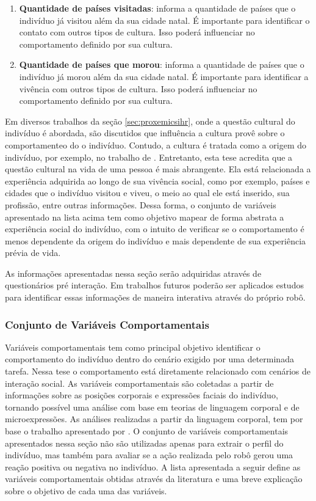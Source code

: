 \begin{enumerate}
	\item \textbf{Quantidade de países visitadas}: informa a quantidade de países que o indivíduo já visitou além da sua cidade natal. É importante para identificar o contato com outros tipos de cultura. Isso poderá influenciar no comportamento definido por sua cultura.
	\item \textbf{Quantidade de países que morou}: informa a quantidade de países que o indivíduo já morou além da sua cidade natal. É importante para identificar a vivência com outros tipos de cultura. Isso poderá influenciar no comportamento definido por sua cultura.
\end{enumerate}

Em diversos trabalhos da seção \ref{sec:proxemicsihr}, onde a questão cultural do indivíduo é abordada, são discutidos que influência a cultura provê sobre o comportamenteo do o indivíduo. Contudo, a cultura é tratada como a origem do indivíduo, por exemplo, no trabalho de . Entretanto, esta tese acredita que a questão cultural na vida de uma pessoa é mais abrangente. Ela está relacionada a experiência adquirida ao longo de sua vivência social, como por exemplo, países e cidades que o indivíduo visitou e viveu, o meio ao qual ele está inserido, sua profissão, entre outras informações. Dessa forma, o conjunto de variáveis apresentado na lista acima tem como objetivo mapear de forma abstrata a experiência social do indivíduo, com o intuito de verificar se o comportamento é menos dependente da origem do indivíduo e mais dependente de sua experiência prévia de vida.

As informações apresentadas nessa seção serão adquiridas através de questionários pré interação. Em trabalhos futuros poderão ser aplicados estudos para identificar essas informações de maneira interativa através do próprio robô.

\subsubsection{Conjunto de Variáveis Comportamentais}
\label{sec:variaveiscomportamentais}

Variáveis comportamentais tem como principal objetivo identificar o comportamento do indivíduo dentro do cenário exigido por uma determinada tarefa. Nessa tese o comportamento está diretamente relacionado com cenários de interação social. As variáveis comportamentais são coletadas a partir de informações sobre as posições corporais e expressões faciais do indivíduo, tornando possível uma análise com base em teorias de linguagem corporal e de microexpressões. As análises realizadas a partir da linguagem corporal, tem por base o trabalho apresentado por . O conjunto de variáveis comportamentais apresentados nessa seção não são utilizadas apenas para extrair o perfil do indivíduo, mas também para avaliar se a ação realizada pelo robô gerou uma reação positiva ou negativa no indivíduo. A lista apresentada a seguir define as variáveis comportamentais obtidas através da literatura e uma breve explicação sobre o objetivo de cada uma das variáveis.


